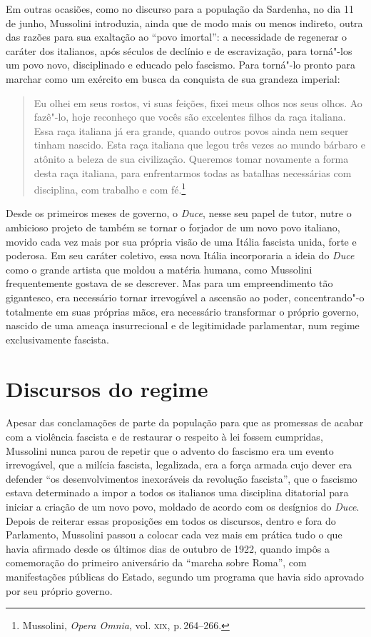 Em outras ocasiões, como no discurso para a população da Sardenha, no
dia 11 de junho, Mussolini introduzia, ainda que de modo mais ou menos
indireto, outra das razões para sua exaltação ao ``povo imortal'': a
necessidade de regenerar o caráter dos italianos, após séculos de
declínio e de escravização, para torná"-los um povo novo, disciplinado e
educado pelo fascismo. Para torná"-lo pronto para marchar como um
exército em busca da conquista de sua grandeza imperial:

\begin{quote}
Eu olhei em seus rostos, vi suas feições, fixei meus olhos nos seus
olhos. Ao fazê"-lo, hoje reconheço que vocês são excelentes filhos da
raça italiana. Essa raça italiana já era grande, quando outros povos
ainda nem sequer tinham nascido. Esta raça italiana que legou três vezes
ao mundo bárbaro e atônito a beleza de sua civilização. Queremos tomar
novamente a forma desta raça italiana, para enfrentarmos todas as
batalhas necessárias com disciplina, com trabalho e com fé.\footnote{Mussolini,
  \emph{Opera Omnia}, vol. \textsc{xix}, p.\,264--266.}
\end{quote}

Desde os primeiros meses de governo, o \emph{Duce}, nesse seu papel de
tutor, nutre o ambicioso projeto de também se tornar o forjador de um
novo povo italiano, movido cada vez mais por sua própria visão de uma
Itália fascista unida, forte e poderosa. Em seu caráter coletivo, essa
nova Itália incorporaria a ideia do \emph{Duce} como o grande artista
que moldou a matéria humana, como Mussolini frequentemente gostava de se
descrever. Mas para um empreendimento tão gigantesco, era necessário
tornar irrevogável a ascensão ao poder, concentrando"-o totalmente em
suas próprias mãos, era necessário transformar o próprio governo,
nascido de uma ameaça insurrecional e de legitimidade parlamentar, num
regime exclusivamente fascista.

\section{Discursos do regime}

Apesar das conclamações de parte da população para que as promessas de
acabar com a violência fascista e de restaurar o respeito à lei fossem
cumpridas, Mussolini nunca parou de repetir que o advento do fascismo
era um evento irrevogável, que a milícia fascista, legalizada, era a
força armada cujo dever era defender ``os desenvolvimentos inexoráveis
da revolução fascista'', que o fascismo estava determinado a impor a
todos os italianos uma disciplina ditatorial para iniciar a criação de
um novo povo, moldado de acordo com os desígnios do \emph{Duce}. Depois
de reiterar essas proposições em todos os discursos, dentro e fora do
Parlamento, Mussolini passou a colocar cada vez mais em prática tudo o
que havia afirmado desde os últimos dias de outubro de 1922, quando
impôs a comemoração do primeiro aniversário da ``marcha sobre Roma'',
com manifestações públicas do Estado, segundo um programa que havia sido
aprovado por seu próprio governo.

